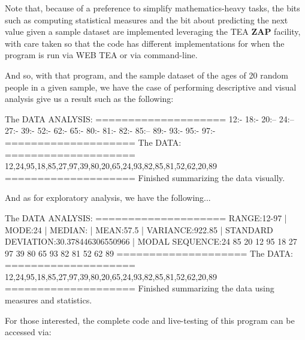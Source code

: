 \documentclass[a4paper, 18pt]{book} %
\begin{document}
{  \vspace{2em}

Note that, because of a preference to simplify mathematics-heavy tasks, the bits such as computing statistical measures and the bit about predicting the next value given a sample  dataset are implemented leveraging the TEA \textbf{ZAP} facility, with care taken so that the code has different implementations for when the program is run via WEB TEA or via command-line.

\vspace{2em}


And so, with that program, and the sample dataset of the ages of 20 random people in a given sample, we have the case of performing descriptive and visual analysis give us a result such as the following:


 \begin{tcbverbatim}[title=Sample OUTPUT DATA ANALYSIS (Descriptive) of Dataset of 20 Random Numbers (Ages)]
The DATA ANALYSIS:
====================
12:-
18:-
20:--
24:--
27:-
39:-
52:-
62:-
65:-
80:-
81:-
82:-
85:--
89:-
93:-
95:-
97:-
====================
The DATA:
====================
12,24,95,18,85,27,97,39,80,20,65,24,93,82,85,81,52,62,20,89
====================
Finished summarizing the data visually.  
  \end{tcbverbatim}


\vspace{2em}

And as for exploratory analysis, we have the following...


 \begin{tcbverbatim}[title=Sample OUTPUT DATA ANALYSIS (Summary) of Dataset of 20 Random Numbers (Ages)]
The DATA ANALYSIS:
====================
RANGE:12-97 | MODE:24 | MEDIAN: | MEAN:57.5 | VARIANCE:922.85 | STANDARD DEVIATION:30.378446306550966 | MODAL SEQUENCE:24 85 20 12 95 18 27 97 39 80 65 93 82 81 52 62 89
====================
The DATA:
====================
12,24,95,18,85,27,97,39,80,20,65,24,93,82,85,81,52,62,20,89
====================
Finished summarizing the data using measures and statistics. 
  \end{tcbverbatim}

 
\vspace{2em}



\vspace{2em}


 


For those interested, the complete code and live-testing of this program can be accessed via:


}
\end{document}
